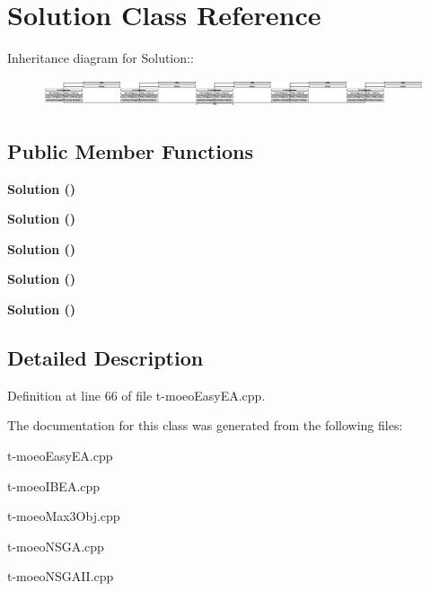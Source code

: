 \section{Solution Class Reference}
\label{classSolution}
Inheritance diagram for Solution::\begin{figure}[H]
\begin{center}
\leavevmode
\includegraphics[height=0.823529cm]{classSolution}
\end{center}
\end{figure}
\subsection*{Public Member Functions}
\begin{CompactItemize}
\item 
\bf{Solution} ()\label{classSolution_b55bd4b023d596ce11aaf737b9a6123b}

\item 
\bf{Solution} ()\label{classSolution_b55bd4b023d596ce11aaf737b9a6123b}

\item 
\bf{Solution} ()\label{classSolution_b55bd4b023d596ce11aaf737b9a6123b}

\item 
\bf{Solution} ()\label{classSolution_b55bd4b023d596ce11aaf737b9a6123b}

\item 
\bf{Solution} ()\label{classSolution_b55bd4b023d596ce11aaf737b9a6123b}

\end{CompactItemize}


\subsection{Detailed Description}




Definition at line 66 of file t-moeo\-Easy\-EA.cpp.

The documentation for this class was generated from the following files:\begin{CompactItemize}
\item 
t-moeo\-Easy\-EA.cpp\item 
t-moeo\-IBEA.cpp\item 
t-moeo\-Max3Obj.cpp\item 
t-moeo\-NSGA.cpp\item 
t-moeo\-NSGAII.cpp\end{CompactItemize}
